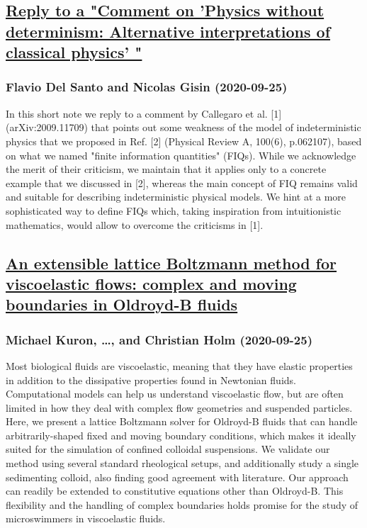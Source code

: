\subsection*{\href{http://arxiv.org/abs/2009.12284v1}{Reply to a "Comment on 'Physics without determinism: Alternative  interpretations of classical physics' "}}
\subsubsection*{Flavio Del Santo and Nicolas Gisin (2020-09-25)}
In this short note we reply to a comment by Callegaro et al. [1]
(arXiv:2009.11709) that points out some weakness of the model of
indeterministic physics that we proposed in Ref. [2] (Physical Review A,
100(6), p.062107), based on what we named "finite information quantities"
(FIQs). While we acknowledge the merit of their criticism, we maintain that it
applies only to a concrete example that we discussed in [2], whereas the main
concept of FIQ remains valid and suitable for describing indeterministic
physical models. We hint at a more sophisticated way to define FIQs which,
taking inspiration from intuitionistic mathematics, would allow to overcome the
criticisms in [1].

\subsection*{\href{http://arxiv.org/abs/2009.12279v1}{An extensible lattice Boltzmann method for viscoelastic flows: complex  and moving boundaries in Oldroyd-B fluids}}
\subsubsection*{Michael Kuron, \dots, and Christian Holm (2020-09-25)}
Most biological fluids are viscoelastic, meaning that they have elastic
properties in addition to the dissipative properties found in Newtonian fluids.
Computational models can help us understand viscoelastic flow, but are often
limited in how they deal with complex flow geometries and suspended particles.
Here, we present a lattice Boltzmann solver for Oldroyd-B fluids that can
handle arbitrarily-shaped fixed and moving boundary conditions, which makes it
ideally suited for the simulation of confined colloidal suspensions. We
validate our method using several standard rheological setups, and additionally
study a single sedimenting colloid, also finding good agreement with
literature. Our approach can readily be extended to constitutive equations
other than Oldroyd-B. This flexibility and the handling of complex boundaries
holds promise for the study of microswimmers in viscoelastic fluids.

